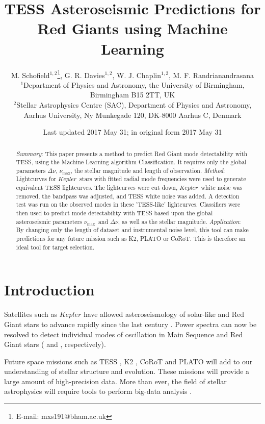 \documentclass[a4paper,fleqn,usenatbib,useAMS]{mnras}
\title[TRG]{TESS Asteroseismic Predictions for Red Giants using Machine Learning}
\author[M. Schofield et al.]{M. Schofield$^{1, 2}$\thanks{E-mail: mxs191@bham.ac.uk}, G. R. Davies$^{1, 2}$, W. J. Chaplin$^{1, 2}$, M. F. Randrianandrasana
\\
$^{1}$Department of Physics and Astronomy, the University of Birmingham, Birmingham B15 2TT, UK \\
$^{2}$Stellar Astrophysics Centre (SAC), Department of Physics and Astronomy, Aarhus University, Ny Munkegade 120, DK-8000 Aarhus C, Denmark}
\date{Last updated 2017 May 31; in original form 2017 May 31}
\newcommand{\numax}{\ensuremath{\nu_{\textrm{max}}}}
\newcommand{\dnu}{\ensuremath{\Delta\nu}}
\newcommand{\kep}{\ensuremath{Kepler}}
\begin{document}
\label{firstpage}
\pagerange{\pageref{firstpage}--\pageref{lastpage}}
\maketitle

\begin{abstract}
{\it Summary}: This paper presents a method to predict Red Giant mode detectability with TESS, using the Machine Learning algorithm Classification. It requires only the global parameters \dnu, \numax, the stellar magnitude and length of observation. \newline
{\it Method}: Lightcurves for \kep \ stars with fitted radial mode frequencies were used to generate equivalent TESS lightcurves. The lightcurves were cut down, \kep \ white noise was removed, the bandpass was adjusted, and TESS white noise was added. A detection test was run on the observed modes in these 'TESS-like' lightcurves. Classifiers were then used to predict mode detectability with TESS based upon the global asteroseismic parameters \numax \ and \dnu, as well as the stellar magnitude.\newline
{\it Application}: By changing only the length of dataset and instrumental noise level, this tool can make predictions for any future mission such as K2, PLATO or CoRoT. This is therefore an ideal tool for target selection.
\end{abstract}


\section{Introduction}

Satellites such as $Kepler$ have allowed asteroseismology of solar-like and Red Giant stars to advance rapidly since the last century \citet{chaplin_asteroseismology_2013}. Power spectra can now be resolved to detect individual modes of oscillation in Main Sequence and Red Giant stars (\citet{lund_standing_2017} and \citet{davies_asteroseismology_2016}, respectively).

Future space missions such as TESS \citep{ricker_transiting_2014}, K2 \citep{howell_k2_2014}, CoRoT \citep{baglin_corot:_2006} and PLATO \citep{rauer_plato_2014} will add to our understanding of stellar structure and evolution. These missions will provide a large amount of high-precision data. More than ever, the field of stellar astrophysics will require tools to perform big-data analysis \citep{kremer_big_2017}. 
\end{document}
